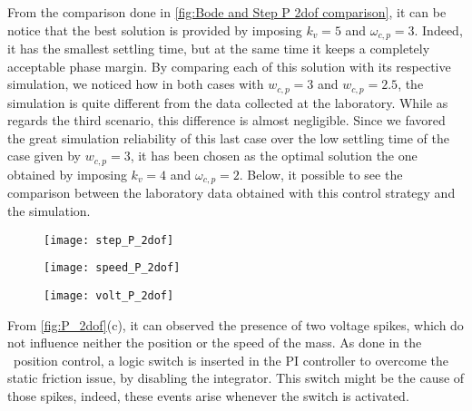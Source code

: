 From the comparison done in \ref{fig:Bode and Step P 2dof comparison}, it can be notice that the best solution is provided by imposing $k_v=5$ and  $\omega_{c,p}=3$. Indeed, it has the smallest settling time, but at the same time it keeps a completely acceptable phase margin. By comparing each of this solution with its respective simulation, we noticed how in both cases with $w_{c,p}=3$ and $w_{c,p}=2.5$, the simulation is quite different from the data collected at the laboratory. While as regards the third scenario, this difference is almost negligible. Since we favored the great simulation reliability of this last case over the low settling time of the case given by $w_{c,p}=3$, it has been chosen as the optimal solution the one obtained by imposing $k_v=4$ and $\omega_{c,p}=2$.
Below, it possible to see the comparison between the laboratory data obtained with this control strategy and the simulation.
\begin{figure*}[h]
	\centering
	\begin{subfigure}{0.48\columnwidth}
		\texttt{[image: step\_P\_2dof]}
	\end{subfigure}
	\begin{subfigure}{0.45\columnwidth}
		\texttt{[image: speed\_P\_2dof]}
	\end{subfigure}
	\begin{subfigure}{0.45\columnwidth}
		\texttt{[image: volt\_P\_2dof]}
	\end{subfigure}
	\caption{Position control loop with $k_{p} =2$ with a position step of $\frac{\pi}{4}$}
	\label{fig:P_2dof}
\end{figure*}
\newline
From \cref{fig:P_2dof}(c), it can observed the presence of two voltage spikes, which do not influence neither the position or the speed of the mass. As done in the \onedof\ position control, a logic switch is inserted in the PI controller to overcome the static friction issue, by disabling the integrator. This switch might be the cause of those spikes, indeed, these events arise whenever the switch is activated. 
